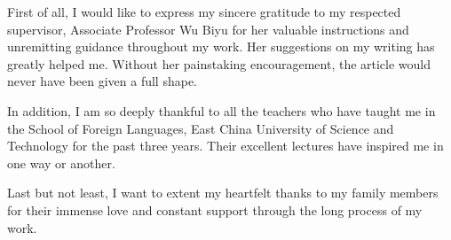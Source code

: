 \acknowledgment
\begin{text}

First of all, I would like to express my sincere gratitude to my respected supervisor, Associate Professor Wu Biyu for her valuable instructions and unremitting guidance throughout my work. Her suggestions on my writing has greatly helped me. Without her painstaking encouragement, the article would never have been given a full shape.

In addition, I am so deeply thankful to all the teachers who have taught me in the School of Foreign Languages, East China University of Science and Technology for the past three years. Their excellent lectures have inspired me in one way or another.

Last but not least, I want to extent my heartfelt thanks to my family members for their immense love and constant support through the long process of my work.

\end{text}

